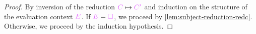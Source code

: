 \begin{proof}
  By inversion of the reduction $\tm{C}\rede\tm{C'}$ and induction on the structure of the evaluation context $\tm{E}$. If $\tm{E}=\tm{\hole}$, we proceed by \cref{lem:subject-reduction-redc}. Otherwise, we proceed by the induction hypothesis.
\end{proof}

